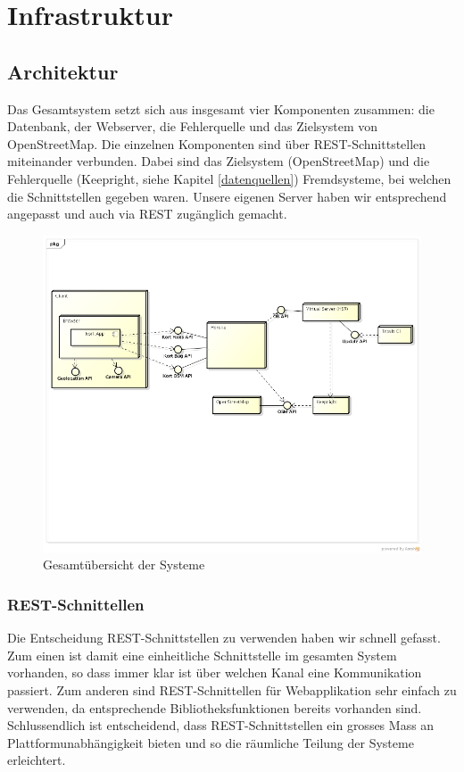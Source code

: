 \chapter{Infrastruktur}
\label{infrastruktur}

\section{Architektur}

Das Gesamtsystem setzt sich aus insgesamt vier Komponenten zusammen: die Datenbank, der Webserver, die Fehlerquelle und das Zielsystem von OpenStreetMap. 
Die einzelnen Komponenten sind über \gls{REST}-Schnittstellen miteinander verbunden. 
Dabei sind das Zielsystem (OpenStreetMap) und die Fehlerquelle (Keepright, siehe Kapitel \ref{datenquellen}) Fremdsysteme, bei welchen die Schnittstellen gegeben waren. 
Unsere eigenen Server haben wir entsprechend angepasst und auch via REST zugänglich gemacht.

\begin{figure}[H]
	\centering
	\includegraphics[width=\textwidth]{images/uml/deployment_diagram}
	\caption{Gesamtübersicht der Systeme}
	\label{deplyoyment-diagram}
\end{figure}

\subsection{REST-Schnittellen}
Die Entscheidung \gls{REST}-Schnittstellen zu verwenden haben wir schnell gefasst. 
Zum einen ist damit eine einheitliche Schnittstelle im gesamten System vorhanden, so dass immer klar ist über welchen Kanal eine Kommunikation passiert.
Zum anderen sind \gls{REST}-Schnittellen für Webapplikation sehr einfach zu verwenden, da entsprechende Bibliotheksfunktionen bereits vorhanden sind.
Schlussendlich ist entscheidend, dass \gls{REST}-Schnittstellen ein grosses Mass an Plattformunabhängigkeit bieten und so die räumliche Teilung der Systeme erleichtert.

